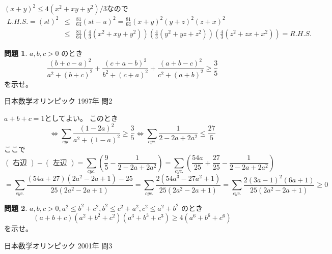 \documentclass[uplatex, a5paper]{jsarticle}
\makeatletter
\theoremstyle{definition}
\newtheorem{prob}{問題}
\renewenvironment{proof}[1][\proofname]{
  \pushQED{\qed}%
  \normalfont \topsep6\p@\@plus6\p@\relax
  \trivlist
  \item[\hskip\labelsep
    #1\@addpunct{\textbf{.}}]\ignorespaces
}{%
  \popQED\endtrivlist\@endpefalse
}
\providecommand{\proofname}{証明}
\newcommand{\lhs }{ L.H.S. }
\newcommand{\rhs }{ R.H.S. }
\def\qed{\hfill $\Box$}
\makeatother
\begin{document}
\begin{proof}
  \((x+y)^2 \leq 4(x^2+xy+y^2)/3\)なので
  \begin{align*}
    \lhs = (st)^2 & \leq & \frac{81}{64}(st-u)^2 = \frac{81}{64}(x+y)^2(y+z)^2(z+x)^2 \\
    & \leq & \frac{81}{64}\left( \frac{4}{3}(x^2+xy+y^2) \right) \left( \frac{4}{3}(y^2+yz+z^2) \right)
    \left( \frac{4}{3}(z^2+zx+x^2) \right) = \rhs
  \end{align*}
\end{proof}










\newpage

\begin{prob}
  \(a,b,c>0\)
  のとき
  \[
  \frac{(b+c-a)^2}{a^2+(b+c)^2} + \frac{(c+a-b)^2}{b^2+(c+a)^2} + \frac{(a+b-c)^2}{c^2+(a+b)^2} \geq \frac{3}{5}
  \]
  を示せ。
  \begin{flushright}
    日本数学オリンピック 1997年 問2
  \end{flushright}
\end{prob}


\begin{proof}
  $a+b+c=1$としてよい。
  このとき
  \[
  \Leftrightarrow \sum_{cyc.}\frac{(1-2a)^2}{a^2+(1-a)^2}
  \geq \frac{3}{5} \Leftrightarrow \sum_{cyc.}\frac{1}{2-2a+2a^2} \leq \frac{27}{5}
  \]
  ここで
  \[
  \left( \mbox{ 右辺 } \right) - \left( \mbox{ 左辺 } \right)
  = \sum_{cyc.} \left( \frac{9}{5} - \frac{1}{2-2a+2a^2} \right)
  = \sum_{cyc.} \left( \frac{54a}{25} + \frac{27}{25} - \frac{1}{2-2a+2a^2} \right)
  \]
  \[
  = \sum_{cyc.} \frac{ (54a+27)(2a^2-2a+1) -25 }{25(2a^2-2a+1)}
  = \sum_{cyc.} \frac{ 2(54a^3-27a^2+1) }{25(2a^2-2a+1)}
  = \sum_{cyc.} \frac{ 2(3a-1)^2(6a+1) }{25(2a^2-2a+1)} \geq 0
  \]
\end{proof}











\newpage

\begin{prob}
  \(a , b , c > 0 , a^2\leq b^2+c^2 , b^2\leq c^2+a^2 , c^2 \leq a^2+b^2\)
  のとき
  \[
  (a+b+c)(a^2+b^2+c^2)(a^3+b^3+c^3) \geq 4(a^6+b^6+c^6)
  \]
  を示せ。
  \begin{flushright}
    日本数学オリンピック 2001年 問3
  \end{flushright}
\end{prob}
\end{document}
